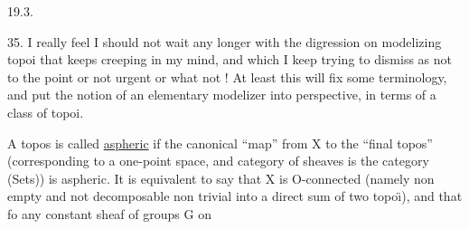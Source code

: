 19.3.

35.  I really feel I should not wait any longer with the digression on
modelizing topoi that keeps creeping in my mind,  and which I keep trying
to dismiss as not to the point or not urgent or what not !  At least this
will fix some terminology,  and put the notion of an elementary modelizer
into perspective,  in terms of a  class of topoi.

A topos is called \uline{aspheric} if the canonical ``map'' from X to the ``final
topos'' (corresponding to a one-point space,  and  category of sheaves
is the category (Sets)) is aspheric.  It is equivalent to say that X is
O-connected (namely non empty\inserted{,} and not decomposable non trivial into a
direct sum of two topo\"{\i}),  and that fo any constant sheaf of groups G on
